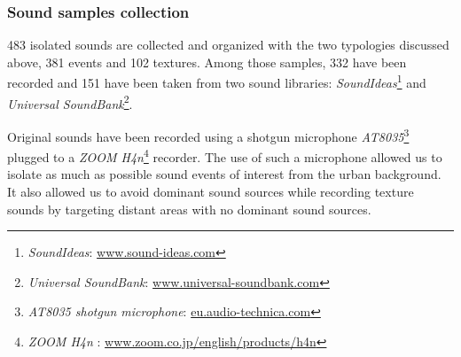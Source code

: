 \documentclass[12pt]{elsarticle}
\providecommand{\DIFaddbegin}{} %
\providecommand{\DIFaddend}{} %
\begin{document}
\DIFaddbegin 

\DIFaddend \subsubsection*{Sound samples collection}


483 isolated sounds are collected and organized with the two typologies discussed above, 381 events and 102 textures. Among those samples, 332 have been recorded and 151 have been taken from two sound libraries: \emph{SoundIdeas}\footnote{\emph{SoundIdeas}: \url{www.sound-ideas.com}} and \emph{Universal SoundBank}\footnote{\emph{Universal SoundBank}: \url{www.universal-soundbank.com}}.


Original sounds have been recorded using a shotgun microphone \emph{AT8035}\footnote{\emph{AT8035 shotgun microphone}: \url{eu.audio-technica.com}} plugged to a \emph{ZOOM H4n}\footnote{\emph{ZOOM H4n} : \url{www.zoom.co.jp/english/products/h4n}} recorder. The use of such a microphone allowed us to isolate as much as possible sound events of interest from the urban background. It also allowed us to avoid dominant sound sources while recording texture sounds by targeting distant areas with no dominant sound sources.
\end{document}
